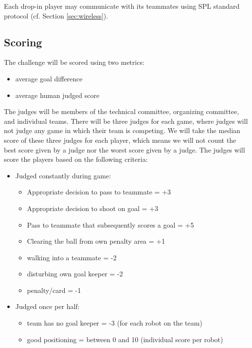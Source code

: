 \documentclass[12pt]{article}
\newcommand{\cf}{\mbox{cf.}\xspace}
\begin{document}
Each drop-in player may communicate with its teammates using SPL standard protocol (\cf Section \ref{sec:wireless}). 


\subsection{Scoring}

The challenge will be scored using two metrics: 
\begin{itemize}
\item average goal difference 
\item average human judged score 
\end{itemize}

The judges will be members of the technical committee, organizing committee, and individual teams.  There will be three judges for each game, where judges will not judge any game in which their team is competing.  We will take the median score of these three judges for each player, which means we will not count the best score given by a judge nor the worst score given by a judge.  The judges will score the players based on the following criteria:
\begin{itemize}
\item Judged constantly during game:
  \begin{itemize}
  \item Appropriate decision to pass to teammate = +3
  \item Appropriate decision to shoot on goal = +3
  \item Pass to teammate that subsequently scores a goal = +5
  \item Clearing the ball from own penalty area = +1
  \item walking into a teammate = -2
  \item disturbing own goal keeper = -2
  \item penalty/card = -1
  \end{itemize}
\item Judged once per half:
  \begin{itemize}
  \item team has no goal keeper = -3 (for each robot on the team)
  \item good positioning = between 0 and 10 (individual score per robot)
  \end{itemize}
\end{itemize}
\end{document}
